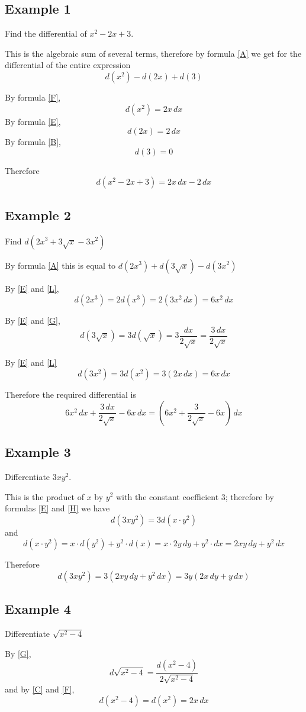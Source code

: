 \subsection*{Example 1}
Find the differential of $x^2 - 2x + 3$.

This is the algebraic sum of several terms, therefore by formula \eqref{A} we get for the differential of the entire expression
\[d(x^2) - d(2x) + d(3)\]

By formula \eqref{F}, \[d(x^2) = 2x\,dx\]
By formula \eqref{E}, \[d(2x) = 2\,dx\]
By formula \eqref{B}, \[d(3) = 0\]

Therefore
\[d(x^2 - 2x + 3) = 2x\,dx - 2\,dx\]

\subsection*{Example 2}
Find $d(2x^3 + 3\sqrt{x} - 3x^2)$

By formula \eqref{A} this is equal to $d(2x^3) + d(3\sqrt{x}) - d(3x^2)$

By \eqref{E} and \eqref{L},
\[d(2x^3) = 2d(x^3) = 2(3x^2\,dx) = 6x^2\,dx\]

By \eqref{E} and \eqref{G},
\[d(3\sqrt{x}) = 3d(\sqrt{x}) = 3\frac{dx}{2\sqrt{x}} = \frac{3\,dx}{2\sqrt{x}}\]

By \eqref{E} and \eqref{L}
\[d(3x^2) = 3d(x^2) = 3(2x\,dx) = 6x\,dx\]

Therefore the required differential is
\[6x^2\,dx + \frac{3\,dx}{2\sqrt{x}} - 6x\,dx = (6x^2 + \frac{3}{2\sqrt{x}} - 6x)\,dx\]

\subsection*{Example 3}
Differentiate $3xy^2$.

This is the product of $x$ by $y^2$ with the constant coefficient 3; therefore by formulas \eqref{E} and \eqref{H} we have
\[d(3xy^2) = 3d(x\cdot y^2)\]
and
\[d(x\cdot y^2) = x\cdot d(y^2) + y^2\cdot d(x) = x\cdot 2y\,dy + y^2\cdot dx = 2xy\,dy + y^2\,dx\]

Therefore
\[d(3xy^2) = 3(2xy\,dy + y^2\,dx) = 3y(2x\,dy + y\,dx)\]

\subsection*{Example 4}
Differentiate $\sqrt{x^2 - 4}$

By \eqref{G},
\[d\sqrt{x^2 - 4} = \frac{d(x^2-4)}{2\sqrt{x^2-4}}\]
and by \eqref{C} and \eqref{F},
\[d(x^2-4) = d(x^2) = 2x\,dx\]

